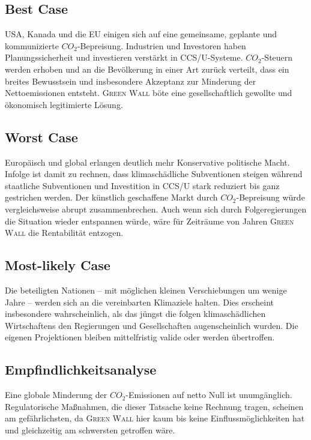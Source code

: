 \subsection{Best Case}

USA, Kanada und die EU einigen sich auf eine gemeinsame, geplante und kommunizierte \(CO_2\)-Bepreisung.
Industrien und Investoren haben Planungssicherheit und investieren verstärkt in CCS/U-Systeme.
\(CO_2\)-Steuern werden erhoben und an die Bevölkerung in einer Art zurück verteilt, dass ein breites Bewusstsein und insbesondere Akzeptanz zur Minderung der Nettoemissionen entsteht.
\textsc{Green Wall} böte eine gesellschaftlich gewollte und ökonomisch legitimierte Lösung.

\subsection{Worst Case}

Europäisch und global erlangen deutlich mehr Konservative politische Macht.
Infolge ist damit zu rechnen, dass klimaschädliche Subventionen steigen während staatliche Subventionen und Investition in CCS/U stark reduziert bis ganz gestrichen werden.
Der künstlich geschaffene Markt durch \(CO_2\)-Bepreisung würde vergleichsweise abrupt zusammenbrechen.
Auch wenn sich durch Folgeregierungen die Situation wieder entspannen würde, wäre für Zeiträume von Jahren \textsc{Green Wall} die Rentabilität entzogen.

\subsection{Most-likely Case}

Die beteiligten Nationen -- mit möglichen kleinen Verschiebungen um wenige Jahre -- werden sich an die vereinbarten Klimaziele halten.
Dies erscheint insbesondere wahrscheinlich, als das jüngst die folgen klimaschädlichen Wirtschaftens den Regierungen und Gesellschaften augenscheinlich wurden.
Die eigenen Projektionen bleiben mittelfristig valide oder werden übertroffen.

\subsection{Empfindlichkeitsanalyse}

Eine globale Minderung der \(CO_2\)-Emissionen auf netto Null ist unumgänglich.
Regulatorische Maßnahmen, die dieser Tatsache keine Rechnung tragen, scheinen am gefährlichsten, da \textsc{Green Wall} hier kaum bis keine Einflussmöglichkeiten hat und gleichzeitig am schwersten getroffen wäre.\par\medskip
%


